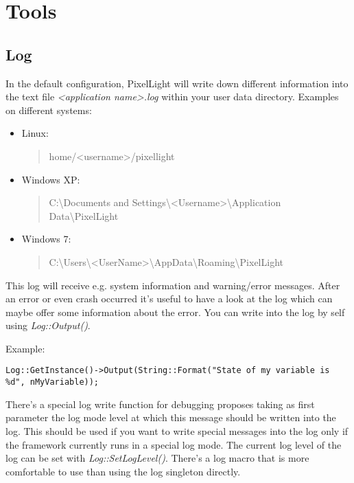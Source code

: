 \section{Tools}




\subsection{Log}
In the default configuration, PixelLight will write down different information into the text file \emph{<application name>.log} within your user data directory. Examples on different systems:
\begin{itemize}
\item{Linux: \begin{quote}home/<username>/pixellight\end{quote}}
\item{Windows XP: \begin{quote}C:\textbackslash Documents and Settings\textbackslash <Username>\textbackslash Application Data\textbackslash PixelLight\end{quote}}
\item{Windows 7: \begin{quote}C:\textbackslash Users\textbackslash <UserName>\textbackslash AppData\textbackslash Roaming\textbackslash PixelLight\end{quote}}
\end{itemize}

This log will receive e.g. system information and warning/error messages. After an error or even crash occurred it's useful to have a look at the log which can maybe offer some information about the error. You can write into the log by self using \emph{Log::Output()}.

Example:
\begin{lstlisting}[caption=Using the log singleton directly]
Log::GetInstance()->Output(String::Format("State of my variable is %d", nMyVariable));
\end{lstlisting}

There's a special log write function for debugging proposes taking as first parameter the log mode level at which this message should be written into the log. This should be used if you want to write special messages into the log only if the framework currently runs in a special log mode. The current log level of the log can be set with \emph{Log::SetLogLevel()}. There's a log macro that is more comfortable to use than using the log singleton directly.

